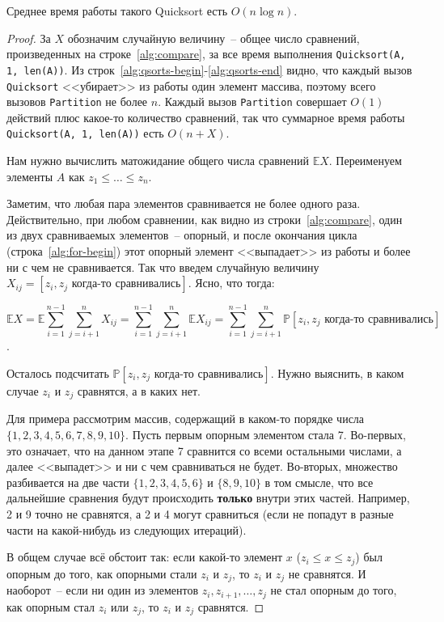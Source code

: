 \begin{theorem*}
    Среднее время работы такого Quicksort есть $O(n\log n)$.
\end{theorem*}
\begin{proof}
    За $X$ обозначим случайную величину~-- общее число сравнений, произведенных на строке~\ref{alg:compare}, за все время выполнения \texttt{Quicksort(A, 1, len(A))}. Из строк~\ref{alg:qsorts-begin}-\ref{alg:qsorts-end} видно, что каждый вызов \texttt{Quicksort} <<убирает>> из работы один элемент массива, поэтому всего вызовов \texttt{Partition} не более $n$. Каждый вызов \texttt{Partition} совершает $O(1)$ действий плюс какое-то количество сравнений, так что суммарное время работы \texttt{Quicksort(A, 1, len(A))} есть $O(n+X)$.
    
    Нам нужно вычислить матожидание общего числа сравнений $\mathbb E X$. Переименуем элементы $A$ как $z_1 \leq \ldots \leq z_n$.
    
    Заметим, что любая пара элементов сравнивается не более одного раза. Действительно, при любом сравнении, как видно из строки~\ref{alg:compare}, один из двух сравниваемых элементов~-- опорный, и после окончания цикла (строка~\ref{alg:for-begin}) этот опорный элемент <<выпадает>> из работы и более ни с чем не сравнивается. Так что введем случайную величину $X_{ij} = [z_i, z_j \text{ когда-то сравнивались}]$. Ясно, что тогда:
    
    $$\mathbb E X = \mathbb E \sum_{i=1}^{n-1} \sum_{j=i+1}^n X_{ij} = \sum_{i=1}^{n-1} \sum_{j=i+1}^n \mathbb E X_{ij} = \sum_{i=1}^{n-1} \sum_{j=i+1}^n \mathbb P[z_i, z_j \text{ когда-то сравнивались}]$$.
    
    Осталось подсчитать $\mathbb P[z_i, z_j\text{ когда-то сравнивались}]$. Нужно выяснить, в каком случае $z_i$ и $z_j$ сравнятся, а в каких нет.
    
    Для примера рассмотрим массив, содержащий в каком-то порядке числа $\{1,2,3,4,5,6,7,8,9,10\}$. Пусть первым опорным элементом стала 7. Во-первых, это означает, что на данном этапе 7 сравнится со всеми остальными числами, а далее <<выпадет>> и ни с чем сравниваться не будет. Во-вторых, множество разбивается на две части $\{1,2,3,4,5,6\}$ и $\{8,9,10\}$ в том смысле, что все дальнейшие сравнения будут происходить \textbf{только} внутри этих частей. Например, 2 и 9 точно не сравнятся, а 2 и 4 могут сравниться (если не попадут в разные части на какой-нибудь из следующих итераций).
    
    В общем случае всё обстоит так: если какой-то элемент $x$ ($z_i \leq x \leq z_j$) был опорным до того, как опорными стали $z_i$ и $z_j$, то $z_i$ и $z_j$ не сравнятся. И наоборот~-- если ни один из элементов $z_i, z_{i+1},\ldots, z_j$ не стал опорным до того, как опорным стал $z_i$ или $z_j$, то $z_i$ и $z_j$ сравнятся.
    

\end{proof}
